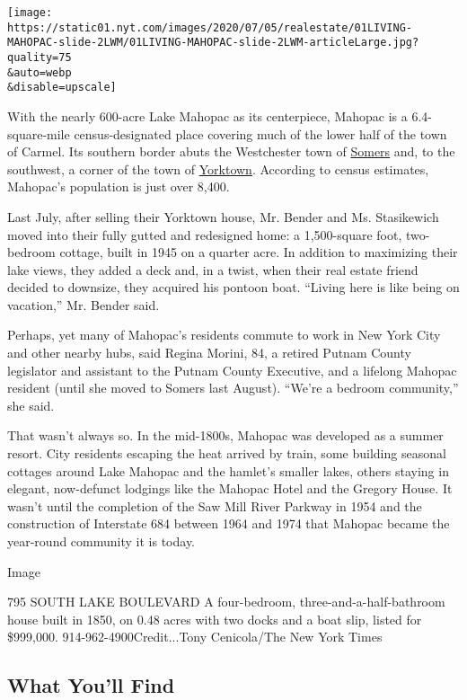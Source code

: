 \texttt{[image: https://static01.nyt.com/images/2020/07/05/realestate/01LIVING-MAHOPAC-slide-2LWM/01LIVING-MAHOPAC-slide-2LWM-articleLarge.jpg?quality=75\\\&auto=webp\\\&disable=upscale]}

With the nearly 600-acre Lake Mahopac as its centerpiece, Mahopac is a
6.4-square-mile census-designated place covering much of the lower half
of the town of Carmel. Its southern border abuts the Westchester town of
\href{https://www.nytimes.com/2019/01/02/realestate/somers-ny-a-close-knit-town-with-plenty-of-shopping-and-great-parks.html}{Somers}
and, to the southwest, a corner of the town of
\href{https://www.nytimes.com/2001/05/13/realestate/if-you-re-thinking-of-living-in-yorktown-a-town-that-values-a-sense-of-country.html}{Yorktown}.
According to census estimates, Mahopac's population is just over 8,400.

Last July, after selling their Yorktown house, Mr. Bender and Ms.
Stasikewich moved into their fully gutted and redesigned home: a
1,500-square foot, two-bedroom cottage, built in 1945 on a quarter acre.
In addition to maximizing their lake views, they added a deck and, in a
twist, when their real estate friend decided to downsize, they acquired
his pontoon boat. ``Living here is like being on vacation,'' Mr. Bender
said.

Perhaps, yet many of Mahopac's residents commute to work in New York
City and other nearby hubs, said Regina Morini, 84, a retired Putnam
County legislator and assistant to the Putnam County Executive, and a
lifelong Mahopac resident (until she moved to Somers last August).
``We're a bedroom community,'' she said.

That wasn't always so. In the mid-1800s, Mahopac was developed as a
summer resort. City residents escaping the heat arrived by train, some
building seasonal cottages around Lake Mahopac and the hamlet's smaller
lakes, others staying in elegant, now-defunct lodgings like the Mahopac
Hotel and the Gregory House. It wasn't until the completion of the Saw
Mill River Parkway in 1954 and the construction of Interstate 684
between 1964 and 1974 that Mahopac became the year-round community it is
today.

Image

795 SOUTH LAKE BOULEVARD \textbar{} A four-bedroom,
three-and-a-half-bathroom house built in 1850, on 0.48 acres with two
docks and a boat slip, listed for \$999,000. 914-962-4900Credit...Tony
Cenicola/The New York Times

\hypertarget{what-youll-find}{%
\subsection{What You'll Find}\label{what-youll-find}}

